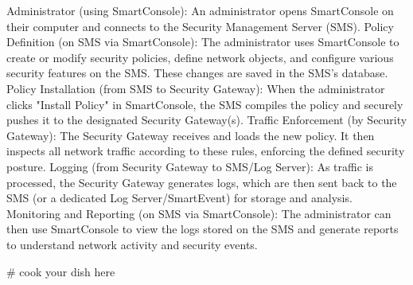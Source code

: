 Administrator (using SmartConsole): An administrator opens SmartConsole on their computer and connects to the Security Management Server (SMS).
Policy Definition (on SMS via SmartConsole): The administrator uses SmartConsole to create or modify security policies, define network objects, and configure various security features on the SMS. These changes are saved in the SMS's database.
Policy Installation (from SMS to Security Gateway): When the administrator clicks "Install Policy" in SmartConsole, the SMS compiles the policy and securely pushes it to the designated Security Gateway(s).
Traffic Enforcement (by Security Gateway): The Security Gateway receives and loads the new policy. It then inspects all network traffic according to these rules, enforcing the defined security posture.
Logging (from Security Gateway to SMS/Log Server): As traffic is processed, the Security Gateway generates logs, which are then sent back to the SMS (or a dedicated Log Server/SmartEvent) for storage and analysis.
Monitoring and Reporting (on SMS via SmartConsole): The administrator can then use SmartConsole to view the logs stored on the SMS and generate reports to understand network activity and security events.




# cook your dish here
